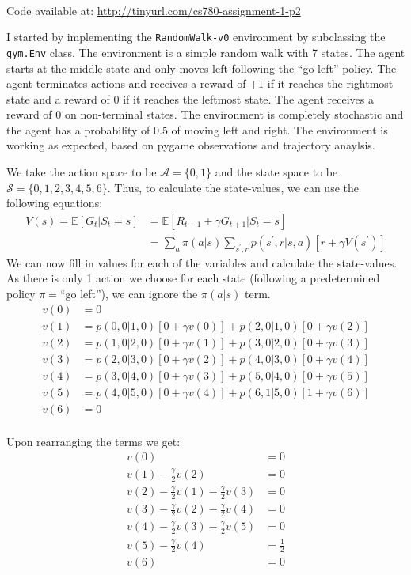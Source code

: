 \\

\noindent Code available at: \url{http://tinyurl.com/cs780-assignment-1-p2}

I started by implementing the \texttt{RandomWalk-v0} environment by subclassing the \texttt{gym.Env} class. The environment is a simple random walk with 7 states. The agent starts at the middle state and only moves left following the ``go-left'' policy. The agent terminates actions and receives a reward of $+1$ if it reaches the rightmost state and a reward of $0$ if it reaches the leftmost state. The agent receives a reward of $0$ on non-terminal states. The environment is completely stochastic and the agent has a probability of $0.5$ of moving left and right. The environment is working as expected, based on pygame observations and trajectory anaylsis.

We take the action space to be $\mathcal{A} = \{0, 1\}$ and the state space to be $\mathcal{S} = \{0, 1, 2, 3, 4, 5, 6\}$. Thus, to calculate the state-values, we can use the following equations:
\begin{align}
    V(s) = \mathbb{E}[G_t|S_t=s] &= \mathbb{E}[R_{t+1} + \gamma G_{t+1}|S_t=s] \\
    &= \sum_{a}\pi(a|s)\sum_{s^{\prime}, r}p(s^{\prime}, r| s, a)[r + \gamma V(s^{\prime})]
\end{align}
We can now fill in values for each of the variables and calculate the state-values. As there is only 1 action we choose for each state (following a predetermined policy $\pi=$``go left''), we can ignore the $\pi(a|s)$ term.
\begin{align*}
    v(0) &= 0 \\
    v(1) &= p(0, 0|1, 0)[0 + \gamma v(0)] + p(2, 0|1, 0)[0 + \gamma v(2)] \\
    v(2) &= p(1, 0|2, 0)[0 + \gamma v(1)] + p(3, 0|2, 0)[0 + \gamma v(3)] \\
    v(3) &= p(2, 0|3, 0)[0 + \gamma v(2)] + p(4, 0|3, 0)[0 + \gamma v(4)] \\
    v(4) &= p(3, 0|4, 0)[0 + \gamma v(3)] + p(5, 0|4, 0)[0 + \gamma v(5)] \\
    v(5) &= p(4, 0|5, 0)[0 + \gamma v(4)] + p(6, 1|5, 0)[1 + \gamma v(6)] \\
    v(6) &= 0 \\
\end{align*}

Upon rearranging the terms we get:
\begin{align*}
    v(0) &= 0 \\
    v(1) - \frac{\gamma}{2}v(2) &= 0 \\
    v(2) - \frac{\gamma}{2}v(1) - \frac{\gamma}{2}v(3) &= 0 \\
    v(3) - \frac{\gamma}{2}v(2) - \frac{\gamma}{2}v(4) &= 0 \\
    v(4) - \frac{\gamma}{2}v(3) - \frac{\gamma}{2}v(5) &= 0 \\
    v(5) - \frac{\gamma}{2}v(4) &= \frac{1}{2} \\
    v(6) &= 0 \\
\end{align*}


